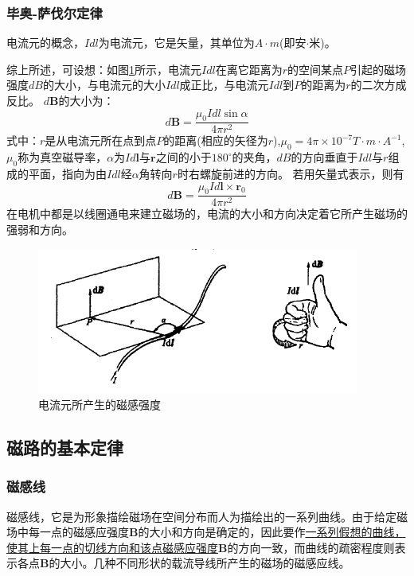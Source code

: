 \documentclass{book}
\begin{document}
\subsubsection{毕奥-萨伐尔定律}

电流元的概念，$Idl$为电流元，它是矢量，其单位为$A \cdot m$(即安$\cdot$米)。

综上所述，可设想：如图\ref{fig:biao}所示，电流元$Idl$在离它距离为$r$的空间某点$P$引起的磁场强度$dB$的大小，与电流元的大小$Idl$成正比，与电流元$Idl$到$P$的距离为$r$的二次方成反比。
$d\bm{B}$的大小为：
\begin{equation}
d\bm{B}=\frac{\mu_{0}Idl\sin\alpha}{4\pi r^2}
\end{equation}
式中：$r$是从电流元所在点到点$P$的距离(相应的矢径为$r$),$\mu_0=4\pi\times 10^{-7}$$T\cdot m\cdot A^{-1}$, $\mu_{0}$称为真空磁导率，$\alpha$为$Id\bm{l}$与$\bm{r}$之间的小于$180^{\circ}$的夹角，$dB$的方向垂直于$Idl$与$r$组成的平面，指向为由$Idl$经$\alpha$角转向$r$时右螺旋前进的方向。
若用矢量式表示，则有
\begin{equation}
d\bm{B}=\frac{\mu_{0}Id\bm{l}\times \bm{r}_0}{4\pi r^2}
\end{equation}
在电机中都是以线圈通电来建立磁场的，电流的大小和方向决定着它所产生磁场的强弱和方向。
\begin{figure}[H]
	\centering
	\includegraphics[width=25pc]{biao}
	\caption{电流元所产生的磁感强度}
	\label{fig:biao}
\end{figure}

\subsection{磁路的基本定律}
\subsubsection{磁感线}
磁感线，它是为形象描绘磁场在空间分布而人为描绘出的一系列曲线。由于给定磁场中每一点的磁感应强度$\bm{B}$的大小和方向是确定的，因此要作\uline{一系列假想的曲线，使其上每一点的切线方向和该点磁感应强度}$\bm{B}$的方向一致，而曲线的疏密程度则表示各点$\bm{B}$的大小。几种不同形状的载流导线所产生的磁场的磁感应线。
\end{document}
